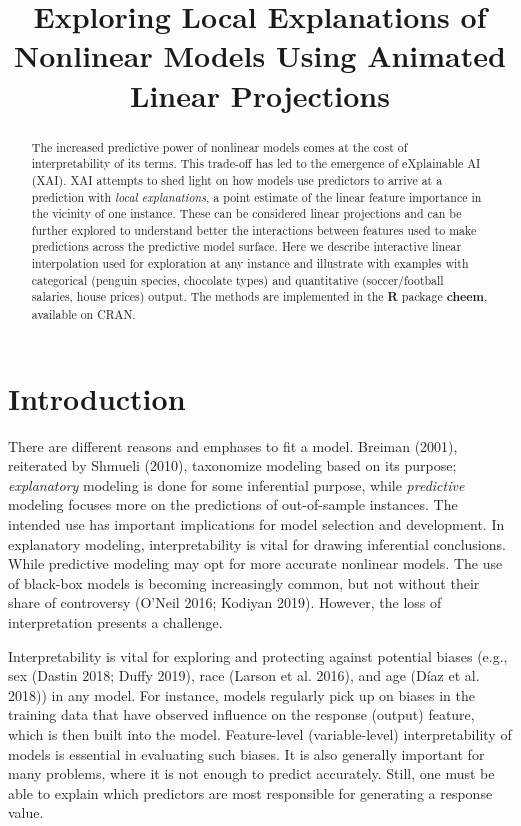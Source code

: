 \documentclass[
]{article}
\title{Exploring Local Explanations of Nonlinear Models Using Animated Linear Projections}
\author{}
\date{\vspace{-2.5em}}
\begin{document}
\maketitle
\begin{abstract}
The increased predictive power of nonlinear models comes at the cost of interpretability of its terms. This trade-off has led to the emergence of eXplainable AI (XAI). XAI attempts to shed light on how models use predictors to arrive at a prediction with \emph{local explanations}, a point estimate of the linear feature importance in the vicinity of one instance. These can be considered linear projections and can be further explored to understand better the interactions between features used to make predictions across the predictive model surface. Here we describe interactive linear interpolation used for exploration at any instance and illustrate with examples with categorical (penguin species, chocolate types) and quantitative (soccer/football salaries, house prices) output. The methods are implemented in the \textbf{R} package \textbf{cheem}, available on CRAN.
\end{abstract}

\hypertarget{sec:intro}{%
\section{Introduction}\label{sec:intro}}

There are different reasons and emphases to fit a model. Breiman (2001), reiterated by Shmueli (2010), taxonomize modeling based on its purpose; \emph{explanatory} modeling is done for some inferential purpose, while \emph{predictive} modeling focuses more on the predictions of out-of-sample instances. The intended use has important implications for model selection and development. In explanatory modeling, interpretability is vital for drawing inferential conclusions. While predictive modeling may opt for more accurate nonlinear models. The use of black-box models is becoming increasingly common, but not without their share of controversy (O'Neil 2016; Kodiyan 2019). However, the loss of interpretation presents a challenge.

Interpretability is vital for exploring and protecting against potential biases (e.g., sex (Dastin 2018; Duffy 2019), race (Larson et al. 2016), and age (Díaz et al. 2018)) in any model. For instance, models regularly pick up on biases in the training data that have observed influence on the response (output) feature, which is then built into the model. Feature-level (variable-level) interpretability of models is essential in evaluating such biases. It is also generally important for many problems, where it is not enough to predict accurately. Still, one must be able to explain which predictors are most responsible for generating a response value.
\end{document}
